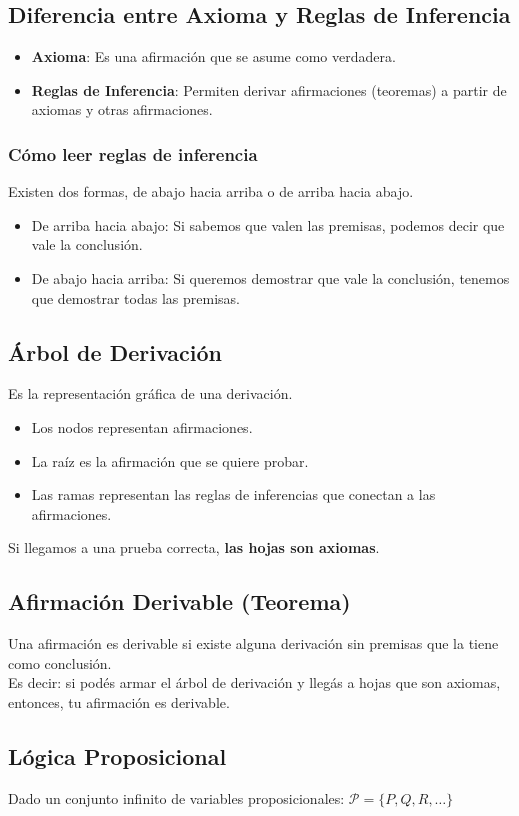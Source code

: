 \documentclass[10pt,a4paper]{article}
\begin{document}
\subsection*{Diferencia entre Axioma y Reglas de Inferencia}
\begin{itemize}
    \item \textbf{Axioma}: Es una afirmación que se asume como verdadera.
    \item \textbf{Reglas de Inferencia}: Permiten derivar afirmaciones (teoremas) a partir de axiomas y otras afirmaciones.
\end{itemize}
\subsubsection*{Cómo leer reglas de inferencia}
Existen dos formas, de abajo hacia arriba o de arriba hacia abajo.
\begin{itemize}
    \item De arriba hacia abajo: Si sabemos que valen las premisas, podemos decir que vale la conclusión.
    \item De abajo hacia arriba: Si queremos demostrar que vale la conclusión, tenemos que demostrar todas las premisas.
\end{itemize}
\subsection*{Árbol de Derivación} 
Es la representación gráfica de una derivación.
\begin{itemize}
    \item Los nodos representan afirmaciones.
    \item La raíz es la afirmación que se quiere probar.
    \item Las ramas representan las reglas de inferencias que conectan a las afirmaciones. 
\end{itemize}
Si llegamos a una prueba correcta, \textbf{las hojas son axiomas}.
\subsection*{Afirmación Derivable (Teorema)}
Una afirmación es derivable si existe alguna derivación sin premisas que la tiene como conclusión. \\
Es decir: si podés armar el árbol de derivación y llegás a hojas que son axiomas, entonces, tu afirmación es derivable.
\subsection*{Lógica Proposicional}
Dado un conjunto infinito de variables proposicionales: $\mathcal{P} = \{P, Q, R, \dots\}$
\end{document}

